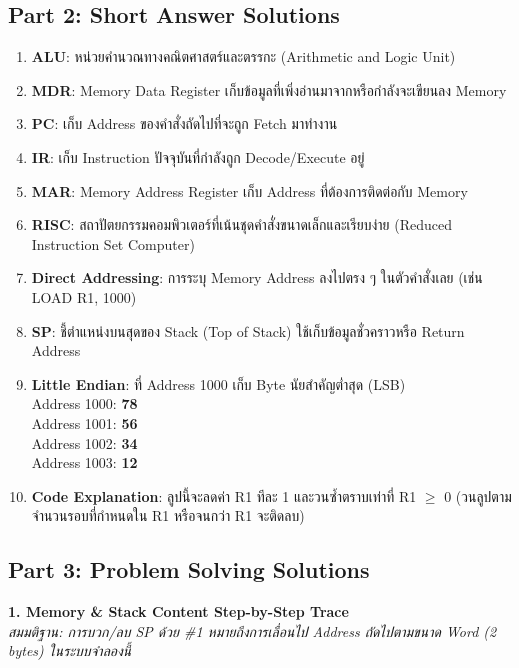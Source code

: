 \documentclass[a4paper,12pt]{article}
\begin{document}
\subsection*{Part 2: Short Answer Solutions}
\begin{enumerate}
    \item \textbf{ALU}: หน่วยคำนวณทางคณิตศาสตร์และตรรกะ (Arithmetic and Logic Unit)
    \item \textbf{MDR}: Memory Data Register เก็บข้อมูลที่เพิ่งอ่านมาจากหรือกำลังจะเขียนลง Memory
    \item \textbf{PC}: เก็บ Address ของคำสั่งถัดไปที่จะถูก Fetch มาทำงาน
    \item \textbf{IR}: เก็บ Instruction ปัจจุบันที่กำลังถูก Decode/Execute อยู่
    \item \textbf{MAR}: Memory Address Register เก็บ Address ที่ต้องการติดต่อกับ Memory
    \item \textbf{RISC}: สถาปัตยกรรมคอมพิวเตอร์ที่เน้นชุดคำสั่งขนาดเล็กและเรียบง่าย (Reduced Instruction Set Computer)
    \item \textbf{Direct Addressing}: การระบุ Memory Address ลงไปตรง ๆ ในตัวคำสั่งเลย (เช่น LOAD R1, 1000)
    \item \textbf{SP}: ชี้ตำแหน่งบนสุดของ Stack (Top of Stack) ใช้เก็บข้อมูลชั่วคราวหรือ Return Address
    \item \textbf{Little Endian}: ที่ Address 1000 เก็บ Byte นัยสำคัญต่ำสุด (LSB)
    \\ Address 1000: \textbf{78}
    \\ Address 1001: \textbf{56}
    \\ Address 1002: \textbf{34}
    \\ Address 1003: \textbf{12}
    \item \textbf{Code Explanation}: ลูปนี้จะลดค่า R1 ทีละ 1 และวนซ้ำตราบเท่าที่ R1 $\ge$ 0 (วนลูปตามจำนวนรอบที่กำหนดใน R1 หรือจนกว่า R1 จะติดลบ)
\end{enumerate}

\subsection*{Part 3: Problem Solving Solutions}

\textbf{1. Memory \& Stack Content Step-by-Step Trace}
\\ \textit{สมมติฐาน: การบวก/ลบ SP ด้วย \#1 หมายถึงการเลื่อนไป Address ถัดไปตามขนาด Word (2 bytes) ในระบบจำลองนี้}
\end{document}
